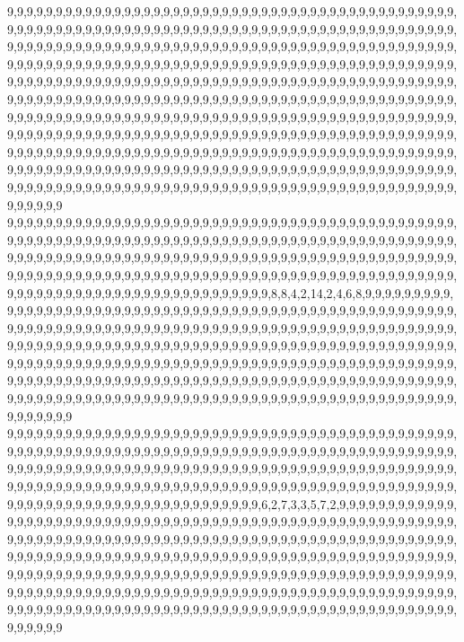 9,9,9,9,9,9,9,9,9,9,9,9,9,9,9,9,9,9,9,9,9,9,9,9,9,9,9,9,9,9,9,9,9,9,9,9,9,9,9,9,9,9,9,9,9,9,9,9,9,9,9,9,9,9,9,9,9,9,9,9,9,9,9,9,9,9,9,9,9,9,9,9,9,9,9,9,9,9,9,9,9,9,9,9,9,9,9,9,9,9,9,9,9,9,9,9,9,9,9,9,9,9,9,9,9,9,9,9,9,9,9,9,9,9,9,9,9,9,9,9,9,9,9,9,9,9,9,9,9,9,9,9,9,9,9,9,9,9,9,9,9,9,9,9,9,9,9,9,9,9,9,9,9,9,9,9,9,9,9,9,9,9,9,9,9,9,9,9,9,9,9,9,9,9,9,9,9,9,9,9,9,9,9,9,9,9,9,9,9,9,9,9,9,9,9,9,9,9,9,9,9,9,9,9,9,9,9,9,9,9,9,9,9,9,9,9,9,9,9,9,9,9,9,9,9,9,9,9,9,9,9,9,9,9,9,9,9,9,9,9,9,9,9,9,9,9,9,9,9,9,9,9,9,9,9,9,9,9,9,9,9,9,9,9,9,9,9,9,9,9,9,9,9,9,9,9,9,9,9,9,9,9,9,9,9,9,9,9,9,9,9,9,9,9,9,9,9,9,9,9,9,9,9,9,9,9,9,9,9,9,9,9,9,9,9,9,9,9,9,9,9,9,9,9,9,9,9,9,9,9,9,9,9,9,9,9,9,9,9,9,9,9,9,9,9,9,9,9,9,9,9,9,9,9,9,9,9,9,9,9,9,9,9,9,9,9,9,9,9,9,9,9,9,9,9,9,9,9,9,9,9,9,9,9,9,9,9,9,9,9,9,9,9,9,9,9,9,9,9,9,9,9,9,9,9,9,9,9,9,9,9,9,9,9,9,9,9,9,9,9,9,9,9,9,9,9,9,9,9,9,9,9,9,9,9,9,9,9,9,9,9,9,9,9,9,9,9,9,9,9,9,9,9,9,9,9,9,9,9,9,9,9,9,9,9,9,9,9,9,9,9,9,9,9,9,9,9,9,9,9,9,9,9,9,9,9,9,9,9,9,9,9,9,9,9,9,9,9,9,9,9,9,9,9,9,9,9,9,9,9,9,9
9,9,9,9,9,9,9,9,9,9,9,9,9,9,9,9,9,9,9,9,9,9,9,9,9,9,9,9,9,9,9,9,9,9,9,9,9,9,9,9,9,9,9,9,9,9,9,9,9,9,9,9,9,9,9,9,9,9,9,9,9,9,9,9,9,9,9,9,9,9,9,9,9,9,9,9,9,9,9,9,9,9,9,9,9,9,9,9,9,9,9,9,9,9,9,9,9,9,9,9,9,9,9,9,9,9,9,9,9,9,9,9,9,9,9,9,9,9,9,9,9,9,9,9,9,9,9,9,9,9,9,9,9,9,9,9,9,9,9,9,9,9,9,9,9,9,9,9,9,9,9,9,9,9,9,9,9,9,9,9,9,9,9,9,9,9,9,9,9,9,9,9,9,9,9,9,9,9,9,9,9,9,9,9,9,9,9,9,9,9,9,9,9,9,9,9,9,9,9,9,9,9,9,9,9,9,9,9,9,9,9,8,8,4,2,14,2,4,6,8,9,9,9,9,9,9,9,9,9,9,9,9,9,9,9,9,9,9,9,9,9,9,9,9,9,9,9,9,9,9,9,9,9,9,9,9,9,9,9,9,9,9,9,9,9,9,9,9,9,9,9,9,9,9,9,9,9,9,9,9,9,9,9,9,9,9,9,9,9,9,9,9,9,9,9,9,9,9,9,9,9,9,9,9,9,9,9,9,9,9,9,9,9,9,9,9,9,9,9,9,9,9,9,9,9,9,9,9,9,9,9,9,9,9,9,9,9,9,9,9,9,9,9,9,9,9,9,9,9,9,9,9,9,9,9,9,9,9,9,9,9,9,9,9,9,9,9,9,9,9,9,9,9,9,9,9,9,9,9,9,9,9,9,9,9,9,9,9,9,9,9,9,9,9,9,9,9,9,9,9,9,9,9,9,9,9,9,9,9,9,9,9,9,9,9,9,9,9,9,9,9,9,9,9,9,9,9,9,9,9,9,9,9,9,9,9,9,9,9,9,9,9,9,9,9,9,9,9,9,9,9,9,9,9,9,9,9,9,9,9,9,9,9,9,9,9,9,9,9,9,9,9,9,9,9,9,9,9,9,9,9,9,9,9,9,9,9,9,9,9,9,9,9,9,9,9,9,9,9,9,9,9,9,9,9,9,9,9,9,9,9,9
9,9,9,9,9,9,9,9,9,9,9,9,9,9,9,9,9,9,9,9,9,9,9,9,9,9,9,9,9,9,9,9,9,9,9,9,9,9,9,9,9,9,9,9,9,9,9,9,9,9,9,9,9,9,9,9,9,9,9,9,9,9,9,9,9,9,9,9,9,9,9,9,9,9,9,9,9,9,9,9,9,9,9,9,9,9,9,9,9,9,9,9,9,9,9,9,9,9,9,9,9,9,9,9,9,9,9,9,9,9,9,9,9,9,9,9,9,9,9,9,9,9,9,9,9,9,9,9,9,9,9,9,9,9,9,9,9,9,9,9,9,9,9,9,9,9,9,9,9,9,9,9,9,9,9,9,9,9,9,9,9,9,9,9,9,9,9,9,9,9,9,9,9,9,9,9,9,9,9,9,9,9,9,9,9,9,9,9,9,9,9,9,9,9,9,9,9,9,9,9,9,9,9,9,9,9,9,9,9,9,6,2,7,3,3,5,7,2,9,9,9,9,9,9,9,9,9,9,9,9,9,9,9,9,9,9,9,9,9,9,9,9,9,9,9,9,9,9,9,9,9,9,9,9,9,9,9,9,9,9,9,9,9,9,9,9,9,9,9,9,9,9,9,9,9,9,9,9,9,9,9,9,9,9,9,9,9,9,9,9,9,9,9,9,9,9,9,9,9,9,9,9,9,9,9,9,9,9,9,9,9,9,9,9,9,9,9,9,9,9,9,9,9,9,9,9,9,9,9,9,9,9,9,9,9,9,9,9,9,9,9,9,9,9,9,9,9,9,9,9,9,9,9,9,9,9,9,9,9,9,9,9,9,9,9,9,9,9,9,9,9,9,9,9,9,9,9,9,9,9,9,9,9,9,9,9,9,9,9,9,9,9,9,9,9,9,9,9,9,9,9,9,9,9,9,9,9,9,9,9,9,9,9,9,9,9,9,9,9,9,9,9,9,9,9,9,9,9,9,9,9,9,9,9,9,9,9,9,9,9,9,9,9,9,9,9,9,9,9,9,9,9,9,9,9,9,9,9,9,9,9,9,9,9,9,9,9,9,9,9,9,9,9,9,9,9,9,9,9,9,9,9,9,9,9,9,9,9,9,9,9,9,9,9,9,9,9,9,9,9,9,9,9,9,9,9,9,9,9,9,9,9
